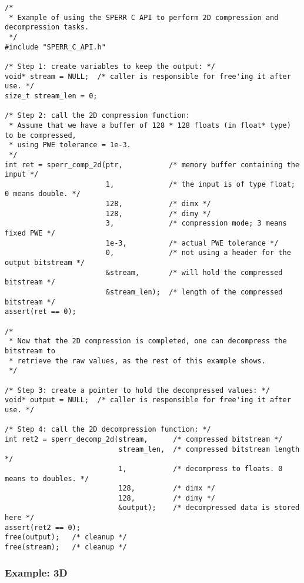 \documentclass{article}
\begin{document}
\begin{verbatim}
/*
 * Example of using the SPERR C API to perform 2D compression and decompression tasks.
 */
#include "SPERR_C_API.h"

/* Step 1: create variables to keep the output: */
void* stream = NULL;  /* caller is responsible for free'ing it after use. */
size_t stream_len = 0;

/* Step 2: call the 2D compression function:
 * Assume that we have a buffer of 128 * 128 floats (in float* type) to be compressed, 
 * using PWE tolerance = 1e-3.
 */
int ret = sperr_comp_2d(ptr,           /* memory buffer containing the input */
                        1,             /* the input is of type float; 0 means double. */
                        128,           /* dimx */
                        128,           /* dimy */
                        3,             /* compression mode; 3 means fixed PWE */
                        1e-3,          /* actual PWE tolerance */
                        0,             /* not using a header for the output bitstream */
                        &stream,       /* will hold the compressed bitstream */
                        &stream_len);  /* length of the compressed bitstream */
assert(ret == 0);

/* 
 * Now that the 2D compression is completed, one can decompress the bitstream to
 * retrieve the raw values, as the rest of this example shows.
 */

/* Step 3: create a pointer to hold the decompressed values: */
void* output = NULL;  /* caller is responsible for free'ing it after use. */

/* Step 4: call the 2D decompression function: */
int ret2 = sperr_decomp_2d(stream,      /* compressed bitstream */
                           stream_len,  /* compressed bitstream length */
                           1,           /* decompress to floats. 0 means to doubles. */
                           128,         /* dimx */
                           128,         /* dimy */
                           &output);    /* decompressed data is stored here */
assert(ret2 == 0);
free(output);   /* cleanup */
free(stream);   /* cleanup */
\end{verbatim}

\subsubsection{Example: 3D}
\end{document}
